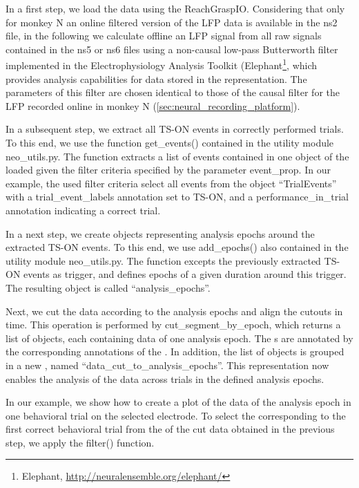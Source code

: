 In a first step, we load the data using the ReachGraspIO. Considering that only for monkey N an online filtered version of the LFP data is available in the ns2 file, in the following we calculate offline an LFP signal from all raw signals contained in the ns5 or ns6 files using a non-causal low-pass Butterworth filter implemented in the Electrophysiology Analysis Toolkit (Elephant\footnote{Elephant, \url{http://neuralensemble.org/elephant/}}, which provides analysis capabilities for data stored in the  representation. The parameters of this filter are chosen identical to those of the causal filter for the LFP recorded online in monkey N (\cref{sec:neural_recording_platform}).

In a subsequent step, we extract all TS-ON events in correctly performed trials. To this end, we use the function get\_events() contained in the utility module neo\_utils.py. The function extracts a list of events contained in one  object of the loaded   given the filter criteria specified by the parameter event\_prop. In our example, the used filter criteria select all events from the  object “TrialEvents” with a trial\_event\_labels annotation set to TS-ON, and a performance\_in\_trial annotation indicating a correct trial.

In a next step, we create  objects representing analysis epochs around the extracted TS-ON events. To this end, we use add\_epochs() also contained in the utility module neo\_utils.py. The function excepts the previously extracted TS-ON events as trigger, and defines epochs of a given duration around this trigger. The resulting  object is called “analysis\_epochs”. 

Next, we cut the data according to the analysis epochs and align the cutouts in time. This operation is performed by cut\_segment\_by\_epoch, which returns a list of  objects, each containing data of one analysis epoch. The s are annotated by the corresponding annotations of the  . In addition, the list of  objects is grouped in a new  , named “data\_cut\_to\_analysis\_epochs”. This representation now enables the analysis of the data across trials in the defined analysis epochs. 

In our example, we show how to create a plot of the data of the analysis epoch in one behavioral trial on the selected electrode. To select the   corresponding to the first correct behavioral trial from the  of the cut data obtained in the previous step, we apply the  filter() function. 


